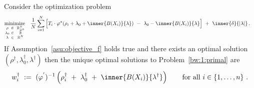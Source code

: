 \begin{ftheorem}
  \label{dual_solution_th}
  Consider the optimization problem
\begin{align}
  \label{dual}
  \begin{split}
  \underset
  {\begin{smallmatrix}
      \rho&\in&&\R^N_{\ge 0} 
      \\
      \lambda_0 & \in&&\R
      \\
      \lambda&\in&&\R^{N}
  \end{smallmatrix}}
  {
    \mathrm{minimize}
  }
  \quad
  &
  \frac{1}{N}
\sum_{i=1} 
  ^N
  \Big[
  T_i
  \cdot
  \varphi^*
  \!
  \left( 
    \rho_i
    +
\lambda_0
+
\inner
{B(X_i)}
{
\lambda
}
  \right)
  \ 
  -
  \ 
\lambda_0
-
\inner
{B(X_i)}
{
\lambda
}
\Big]
  \ 
+
\ 
\inner
{\delta}
{
  |\lambda|
}
  \,.
\end{split}
\end{align}
If Assumption~\ref{asu:objective_f} holds true 
and there exists an optimal solution 
$
(\rho^\dagger,\lambda_0^\dagger,\lambda^\dagger)
$
then the unique optimal solutions to Problem~\ref{bw:1:primal} are 
\begin{gather*}
  w^\dagger_i
  \ 
  :=
  \ 
  (
  \varphi^{'}
  )^{-1}
  \left(
    \rho^\dagger_i
  \ 
    +
  \ 
\lambda_0^\dagger
  \ 
+
  \ 
\inner
{B(X_i)}
{
\lambda^{\dagger}
}
  \right)
  \qquad
  \text{for all}\ 
  i\in
  \left\{ 1,\ldots,n \right\}
  \,.
\end{gather*}
\end{ftheorem}

